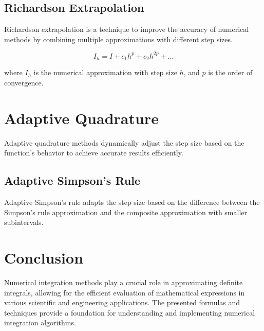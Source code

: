 \documentclass{article}
\begin{document}
\subsection{Richardson Extrapolation}

Richardson extrapolation is a technique to improve the accuracy of numerical methods by combining multiple approximations with different step sizes.

\begin{equation}
    I_h = I + c_1h^p + c_2h^{2p} + \ldots
\end{equation}

where $I_h$ is the numerical approximation with step size $h$, and $p$ is the order of convergence.

\section{Adaptive Quadrature}

Adaptive quadrature methods dynamically adjust the step size based on the function's behavior to achieve accurate results efficiently.

\subsection{Adaptive Simpson's Rule}

Adaptive Simpson's rule adapts the step size based on the difference between the Simpson's rule approximation and the composite approximation with smaller subintervals.

\section{Conclusion}

Numerical integration methods play a crucial role in approximating definite integrals, allowing for the efficient evaluation of mathematical expressions in various scientific and engineering applications. The presented formulas and techniques provide a foundation for understanding and implementing numerical integration algorithms.
\end{document}
